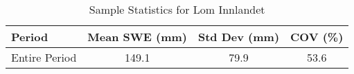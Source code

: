 
    \begin{table}[h!]
        \centering
        \caption{Sample Statistics for Lom Innlandet}
        \begin{tabular}{lccc} 
            \toprule
            \textbf{Period} & \textbf{Mean SWE (mm)} & \textbf{Std Dev (mm)} & \textbf{COV (\%)} \\
            \midrule
            Entire Period & 149.1 & 79.9 & 53.6 \\
            \bottomrule
        \end{tabular}
        \label{tab:sample_stats_Lom Innlandet}
    \end{table}
    